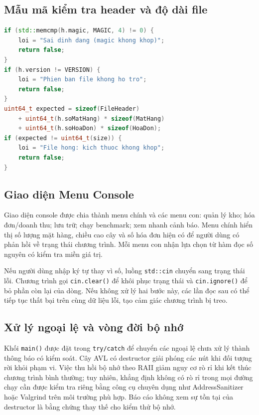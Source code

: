 \subsection{Mẫu mã kiểm tra header và độ dài file}
\begin{lstlisting}[language=C++,caption={Minh họa các điều kiện kiểm tra cấu trúc file}]
if (std::memcmp(h.magic, MAGIC, 4) != 0) {
    loi = "Sai dinh dang (magic khong khop)";
    return false;
}
if (h.version != VERSION) {
    loi = "Phien ban file khong ho tro";
    return false;
}
uint64_t expected = sizeof(FileHeader)
    + uint64_t(h.soMatHang) * sizeof(MatHang)
    + uint64_t(h.soHoaDon) * sizeof(HoaDon);
if (expected != uint64_t(size)) {
    loi = "File hong: kich thuoc khong khop";
    return false;
}
\end{lstlisting}

\subsection{Giao diện Menu Console}
Giao diện console được chia thành menu chính và các menu con: quản lý kho; hóa đơn/doanh thu; lưu trữ; chạy benchmark; xem nhanh cảnh báo. Menu chính hiển thị số lượng mặt hàng, chiều cao cây và số hóa đơn hiện có để người dùng có phản hồi về trạng thái chương trình. Mỗi menu con nhận lựa chọn từ hàm đọc số nguyên có kiểm tra miền giá trị.

Nếu người dùng nhập ký tự thay vì số, luồng \texttt{std::cin} chuyển sang trạng thái lỗi. Chương trình gọi \texttt{cin.clear()} để khôi phục trạng thái và \texttt{cin.ignore()} để bỏ phần còn lại của dòng. Nếu không xử lý hai bước này, các lần đọc sau có thể tiếp tục thất bại trên cùng dữ liệu lỗi, tạo cảm giác chương trình bị treo.

\subsection{Xử lý ngoại lệ và vòng đời bộ nhớ}
Khối \texttt{main()} được đặt trong \texttt{try/catch} để chuyển các ngoại lệ chưa xử lý thành thông báo có kiểm soát. Cây AVL có destructor giải phóng các nút khi đối tượng rời khỏi phạm vi. Việc thu hồi bộ nhớ theo RAII giảm nguy cơ rò rỉ khi kết thúc chương trình bình thường; tuy nhiên, khẳng định không có rò rỉ trong mọi đường chạy cần được kiểm tra riêng bằng công cụ chuyên dụng như AddressSanitizer hoặc Valgrind trên môi trường phù hợp. Báo cáo không xem sự tồn tại của destructor là bằng chứng thay thế cho kiểm thử bộ nhớ.

